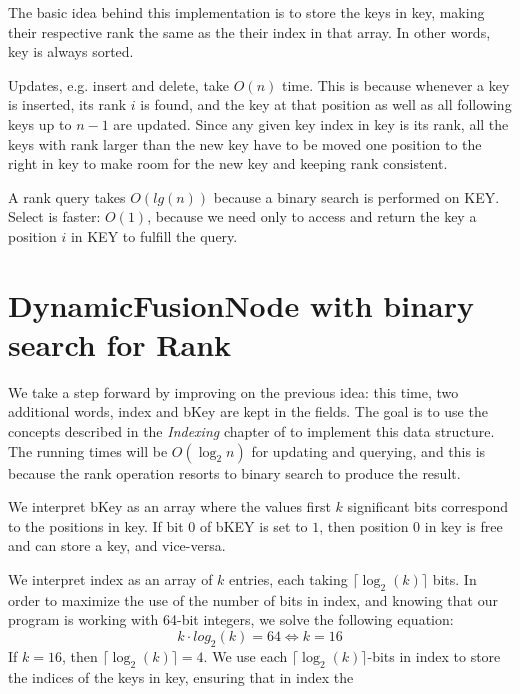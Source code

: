 The basic idea behind this implementation is to store the keys in {\ttfamily key}, making their respective rank the same as the their index in that array. In other words, {\ttfamily key} is always sorted.

Updates, e.g. insert and delete, take $O(n)$ time. This is because whenever a key is inserted, its rank $i$ is found, and the key at that position as well as all following keys up to $n-1$ are updated. Since any given key index in {\ttfamily key} is its rank, all the keys with rank larger than the new key have to be moved one position to the right in {\ttfamily key} to make room for the new key and keeping rank consistent.

A rank query takes $O(lg(n))$ because a binary search is performed on KEY. Select is faster: $O(1)$, because we need only to access and return the key a position $i$ in KEY to fulfill the query.

\section{DynamicFusionNode with binary search for Rank}
We take a step forward by improving on the previous idea: this time, two additional words, {\ttfamily index} and {\ttfamily bKey} are kept in the fields. The goal is to use the concepts described in the \textit{Indexing} chapter of \cite{patrascu2014dynamic} to implement this data structure. The running times will be $O(\log_2 n)$ for updating and querying, and this is because the {\ttfamily rank} operation resorts to binary search to produce the result.

We interpret {\ttfamily bKey} as an array where the values first $k$ significant bits correspond to the positions in {\ttfamily key}. If bit $0$ of {\ttfamily bKEY} is set to $1$, then position $0$ in {\ttfamily key} is free and can store a key, and vice-versa.

We interpret {\ttfamily index} as an array of $k$ entries, each taking $\lceil \log_2(k) \rceil$ bits. In order to maximize the use of the number of bits in {\ttfamily index}, and knowing that our program is working with 64-bit integers, we solve the following equation:
\begin{equation}
    k \cdot log_2(k) = 64 \iff k = 16
\end{equation}
If $k=16$, then $\lceil \log_2(k) \rceil = 4$. We use each $\lceil \log_2(k) \rceil$-bits in {\ttfamily index} to store the indices of the keys in {\ttfamily key}, ensuring that in {\ttfamily index} the

